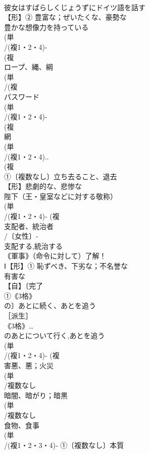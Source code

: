 \documentclass[8pt]{extreport}
\begin{document}
\begin{CJK}{UTF8}{min}
\\	彼女はすばらしくじょうずにドイツ語を話す 
\\	【形】② 豊富な；ぜいたくな、豪勢な 
\\	豊かな想像力を持っている
\\	(単
\\	/(複1・2・4)-
\\	(複
\\	ロープ、縄、綱 
\\	(単
\\	/(複
\\	パスワード 
\\	(単
\\	/(複1・2・4)-
\\	(複
\\	網 
\\	(単
\\	/(複1・2・4)..
\\	(複
\\	①〔複数なし〕立ち去ること、退去
\\	【形】悲劇的な、悲惨な 
\\	陛下（王・皇室などに対する敬称）
\\	(単
\\	/(複1・2・4)- (複
\\	支配者、統治者 
\\	/〔女性〕-
\\	支配する,統治する
\\	｟軍事｠（命令に対して）了解！
\\	Ⅰ【形】① 恥ずべき、下劣な；不名誉な 
\\	有害な
\\	【自】〔完了
\\	①《3格》
\\	の〕あとに続く、あとを追う 
\\	［派生］ 
\\	《3格》…
\\	のあとについて行く,あとを追う
\\	(単
\\	/(複1・2・4)- (複
\\	害悪、悪；火災 
\\	(単
\\	/複数なし 
\\	暗闇、暗がり；暗黒 
\\	(単
\\	/複数なし　
\\	食物、食事
\\	(単
\\	/(複1・2・3・4)‐ ①〔複数なし〕本質 

\end{CJK}
\end{document}
